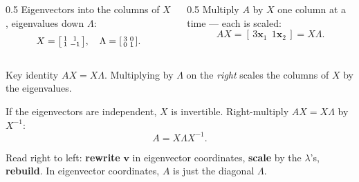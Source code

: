 \documentclass[aspectratio=169, 11pt]{beamer}
\newcommand{\xx}{\mathbf{x}}
\newcommand{\vv}{\mathbf{v}}
\begin{document}
\begin{frame}[t, plain]
  \begin{columns}[T]
    \begin{column}{0.5\textwidth}
      Eigenvectors into the columns of $X$, eigenvalues down $\Lambda$:
      \[ X=\begin{bsmallmatrix} 1 & 1\\ 1 & -1 \end{bsmallmatrix},\quad
         \Lambda=\begin{bsmallmatrix} 3 & 0\\ 0 & 1 \end{bsmallmatrix}. \]
    \end{column}
    \begin{column}{0.5\textwidth}
      Multiply $A$ by $X$ one column at a time --- each is scaled:
      \[ AX=[\,3\xx_1\ \ 1\xx_2\,]=X\Lambda. \]
    \end{column}
  \end{columns}
  \vspace{4pt}
  \begin{block}{Key identity}
    $AX=X\Lambda$. Multiplying by $\Lambda$ on the \emph{right} scales the columns of $X$ by the eigenvalues.
  \end{block}
\end{frame}

\begin{frame}[t, plain]
  If the eigenvectors are independent, $X$ is invertible. Right-multiply $AX=X\Lambda$ by $X^{-1}$:
  \[ A=X\Lambda X^{-1}. \]
  \vspace{-2pt}
  \begin{center}
  \end{center}
  Read right to left: \textbf{rewrite} $\vv$ in eigenvector coordinates, \textbf{scale} by the $\lambda$'s,
  \textbf{rebuild}. In eigenvector coordinates, $A$ is just the diagonal $\Lambda$.
\end{frame}
\end{document}
